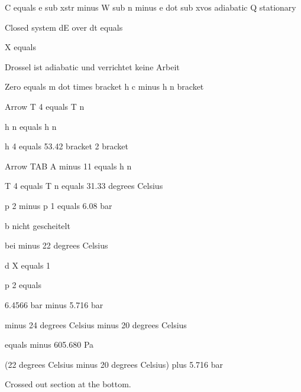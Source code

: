 C equals e sub xstr minus W sub n minus e dot sub xvos adiabatic Q stationary

Closed system
dE over dt equals

X equals

Drossel ist adiabatic und verrichtet keine Arbeit

Zero equals m dot times bracket h c minus h n bracket

Arrow T 4 equals T n

h n equals h n

h 4 equals 53.42 bracket 2 bracket

Arrow TAB A minus 11 equals h n

T 4 equals T n equals 31.33 degrees Celsius

p 2 minus p 1 equals 6.08 bar

b nicht gescheitelt

bei minus 22 degrees Celsius

d X equals 1

p 2 equals

6.4566 bar minus 5.716 bar

minus 24 degrees Celsius minus 20 degrees Celsius

equals minus 605.680 Pa

(22 degrees Celsius minus 20 degrees Celsius) plus 5.716 bar

Crossed out section at the bottom.